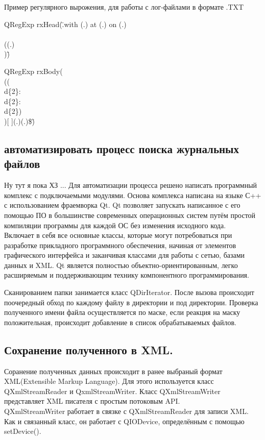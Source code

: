 Пример регулярного вырожения, для работы с лог-файлами в формате .TXT

QRegExp rxHead(\".\*with (.\*) at (.\*) on (.\*)\\\/ \\((.\*)\\)\")

QRegExp rxBody(\"\\((\\d\{2\}:\\d\{2\}:\\d\{2\})\\)[ ]\*(.\*)\:(.\*)\$\")

\subsection{автоматизировать процесс поиска журнальных файлов}
 Ну тут я пока ХЗ ... 
Для автоматизации процесса решено написать программный комплекс с подключаемыми модулями. Основа комплекса написана на языке С++ с использованием фраемворка Qt.
Qt позволяет запускать написанное с его помощью ПО в большинстве современных операционных систем путём простой компиляции программы для каждой ОС без изменения исходного кода.\\
Включает в себя все основные классы, которые могут потребоваться при разработке прикладного программного обеспечения, начиная от элементов графического интерфейса и заканчивая классами для работы с сетью, базами данных и XML. Qt является полностью объектно-ориентированным, легко расширяемым и поддерживающим технику компонентного программирования.

Сканированием папки занимается класс QDirIterator. После вызова происходит поочередный обход по каждому файлу в директории и под директории. Проверка полученного имени файла  осуществляется по маске, если реакция на маску положительная, происходит добавление в список обрабатываемых файлов. 


\subsection{Сохранение полученного в XML.}

Соранение полученных данных происходит в ранее выбраный формат XML(Extensible Markup Language). Для этого используется класс QXmlStreamReader и QxmlStreamWriter.
Класс QXmlStreamWriter представляет XML писателя с простым потоковым API.\\

QXmlStreamWriter работает в связке с QXmlStreamReader для записи XML. Как и связанный класс, он работает с QIODevice, определённым с помощью setDevice().\\

